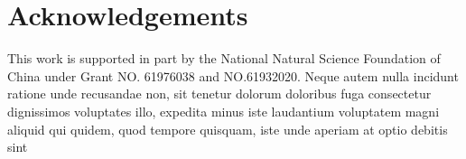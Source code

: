 \documentclass[letterpaper]{article} %
\begin{document}
\section*{Acknowledgements}
This work is supported in part by the National Natural Science Foundation of China under Grant NO. 61976038 and NO.61932020.
Neque autem nulla incidunt ratione unde recusandae non, sit tenetur dolorum doloribus fuga consectetur dignissimos voluptates illo, expedita minus iste laudantium voluptatem magni aliquid qui quidem, quod tempore quisquam, iste unde aperiam at optio debitis sint

\end{document}
